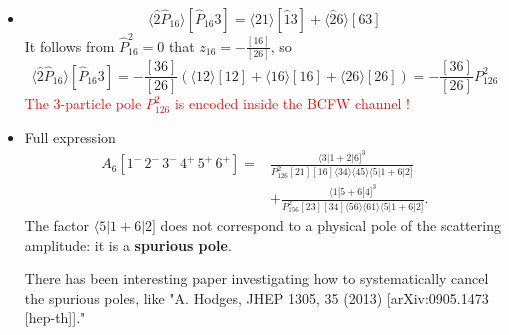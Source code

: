 \documentclass{beamer}
\newcommand{\avg}[1]{\langle #1 \rangle}
\newcommand{\cbrak}[2]{\avg{#1}\![#2]}
\begin{document}
\begin{frame}
    \begin{itemize}
    \item[] $$\cbrak{\hat{2} \hat{P}_{16}}{\hat{P}_{16} 3} = \avg{21}[\hat{1}3] + \avg{\hat{2}6}[63]$$
    It follows from $\hat{P}_{16}^2=0$ that $z_{16}=-\frac{[16]}{[26]}$, so
    \[
\cbrak{\hat{2} \hat{P}_{16}}{\hat{P}_{16} 3}
= -\frac{[36]}{[26]}
\left( \avg{12}[12] + \avg{16}[16] + \avg{26}[26] \right)
= -\frac{[36]}{[26]} P_{126}^2
\]
\textcolor{red}{The 3-particle pole $P_{126}^2$ is encoded inside the BCFW channel !}
    \item Full expression 
    \begin{align*}
        A_6[1^-\,2^-\,3^-\,4^+\,5^+\,6^+] =&
        \frac{ \langle 3|1+2|6]^3}{P_{126}^2 [21][16] \langle 34 \rangle \langle 45 \rangle \langle 5|1+6|2]}\\
        &+\frac{ \langle 1|5+6|4]^3}{P_{156}^2 [23][34] \langle 56 \rangle \langle 61 \rangle \langle 5|1+6|2]}.
    \end{align*}
    The factor $\langle 5|1+6|2]$ does not correspond to a physical pole of the scattering amplitude: it is a \textbf{spurious pole}.

    There has been interesting paper investigating how to systematically cancel the spurious poles,
    like "A. Hodges, JHEP 1305, 35 (2013) [arXiv:0905.1473 [hep-th]]." 
    \end{itemize}
\end{frame}
\end{document}
